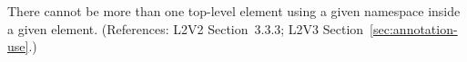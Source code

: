There cannot be more than one top-level element using a given namespace
inside a given  element.  (References: L2V2 Section~3.3.3;
L2V3 Section~\ref{sec:annotation-use}.)

